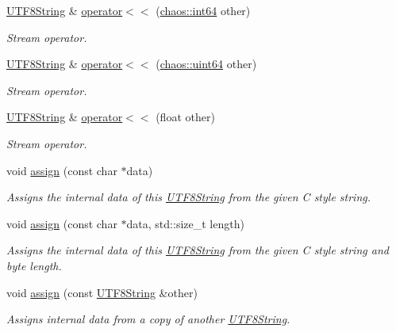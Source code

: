 \begin{DoxyCompactItemize}
\hyperlink{classchaos_1_1uni_1_1_u_t_f8_string}{U\+T\+F8\+String} \& \hyperlink{classchaos_1_1uni_1_1_u_t_f8_string_a7b148a90a57870cf12735e3722992ac0}{operator$<$$<$} (\hyperlink{namespacechaos_aa4cfe70894188e01134a2694db2eb2db}{chaos\+::int64} other)
\begin{DoxyCompactList}\small\item\em Stream operator. \end{DoxyCompactList}\item 
\hyperlink{classchaos_1_1uni_1_1_u_t_f8_string}{U\+T\+F8\+String} \& \hyperlink{classchaos_1_1uni_1_1_u_t_f8_string_a45b9f65068486d6399c5bf9b88fbb021}{operator$<$$<$} (\hyperlink{namespacechaos_a9d62ad11fed4e3a5af70653b228ac910}{chaos\+::uint64} other)
\begin{DoxyCompactList}\small\item\em Stream operator. \end{DoxyCompactList}\item 
\hyperlink{classchaos_1_1uni_1_1_u_t_f8_string}{U\+T\+F8\+String} \& \hyperlink{classchaos_1_1uni_1_1_u_t_f8_string_a0c7dc55985240cfd0f0d96f6f2007c5a}{operator$<$$<$} (float other)
\begin{DoxyCompactList}\small\item\em Stream operator. \end{DoxyCompactList}\item 
void \hyperlink{classchaos_1_1uni_1_1_u_t_f8_string_a87d1da629dd2a2071515e971fd5edffc}{assign} (const char $\ast$data)
\begin{DoxyCompactList}\small\item\em Assigns the internal data of this \hyperlink{classchaos_1_1uni_1_1_u_t_f8_string}{U\+T\+F8\+String} from the given C style string. \end{DoxyCompactList}\item 
void \hyperlink{classchaos_1_1uni_1_1_u_t_f8_string_a5c20ffede72bda70e6743de39aae7128}{assign} (const char $\ast$data, std\+::size\+\_\+t length)
\begin{DoxyCompactList}\small\item\em Assigns the internal data of this \hyperlink{classchaos_1_1uni_1_1_u_t_f8_string}{U\+T\+F8\+String} from the given C style string and byte length. \end{DoxyCompactList}\item 
void \hyperlink{classchaos_1_1uni_1_1_u_t_f8_string_af3e2f751444401ab7b5bc4c07b29de63}{assign} (const \hyperlink{classchaos_1_1uni_1_1_u_t_f8_string}{U\+T\+F8\+String} \&other)
\begin{DoxyCompactList}\small\item\em Assigns internal data from a copy of another \hyperlink{classchaos_1_1uni_1_1_u_t_f8_string}{U\+T\+F8\+String}. \end{DoxyCompactList}\item 

\end{DoxyCompactItemize}
